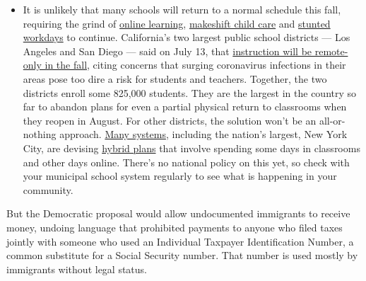 \begin{itemize}
  \begin{itemize}
  \tightlist
  \item
    It is unlikely that many schools will return to a normal schedule
    this fall, requiring the grind of
    \href{https://www.nytimes.com/2020/06/05/us/coronavirus-education-lost-learning.html?action=click\&pgtype=Article\&state=default\&region=MAIN_CONTENT_3\&context=storylines_faq}{online
    learning},
    \href{https://www.nytimes.com/2020/05/29/us/coronavirus-child-care-centers.html?action=click\&pgtype=Article\&state=default\&region=MAIN_CONTENT_3\&context=storylines_faq}{makeshift
    child care} and
    \href{https://www.nytimes.com/2020/06/03/business/economy/coronavirus-working-women.html?action=click\&pgtype=Article\&state=default\&region=MAIN_CONTENT_3\&context=storylines_faq}{stunted
    workdays} to continue. California's two largest public school
    districts --- Los Angeles and San Diego --- said on July 13, that
    \href{https://www.nytimes.com/2020/07/13/us/lausd-san-diego-school-reopening.html?action=click\&pgtype=Article\&state=default\&region=MAIN_CONTENT_3\&context=storylines_faq}{instruction
    will be remote-only in the fall}, citing concerns that surging
    coronavirus infections in their areas pose too dire a risk for
    students and teachers. Together, the two districts enroll some
    825,000 students. They are the largest in the country so far to
    abandon plans for even a partial physical return to classrooms when
    they reopen in August. For other districts, the solution won't be an
    all-or-nothing approach.
    \href{https://bioethics.jhu.edu/research-and-outreach/projects/eschool-initiative/school-policy-tracker/}{Many
    systems}, including the nation's largest, New York City, are
    devising
    \href{https://www.nytimes.com/2020/06/26/us/coronavirus-schools-reopen-fall.html?action=click\&pgtype=Article\&state=default\&region=MAIN_CONTENT_3\&context=storylines_faq}{hybrid
    plans} that involve spending some days in classrooms and other days
    online. There's no national policy on this yet, so check with your
    municipal school system regularly to see what is happening in your
    community.
  \end{itemize}
\end{itemize}

But the Democratic proposal would allow undocumented immigrants to
receive money, undoing language that prohibited payments to anyone who
filed taxes jointly with someone who used an Individual Taxpayer
Identification Number, a common substitute for a Social Security number.
That number is used mostly by immigrants without legal status.

